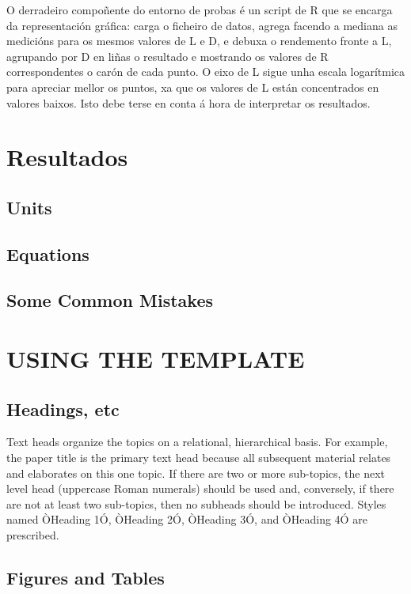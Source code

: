 \documentclass[letterpaper, 10 pt,spanish, conference]{ieeeconf}  %
\begin{document}
    O derradeiro compoñente do entorno de probas é un script de R que se encarga da representación gráfica: carga o ficheiro de datos, agrega facendo a mediana as medicións para os mesmos valores de L e D, e debuxa o rendemento fronte a L, agrupando por D en liñas o resultado e mostrando os valores de R correspondentes o carón de cada punto. O eixo de L sigue unha escala logarítmica para apreciar mellor os puntos, xa que os valores de L están concentrados en valores baixos. Isto debe terse en conta á hora de interpretar os resultados.

\section{Resultados}


\subsection{Units}

\subsection{Equations}


\subsection{Some Common Mistakes}

\section{USING THE TEMPLATE}

\subsection{Headings, etc}

Text heads organize the topics on a relational, hierarchical basis. For example, the paper title is the primary text head because all subsequent material relates and elaborates on this one topic. If there are two or more sub-topics, the next level head (uppercase Roman numerals) should be used and, conversely, if there are not at least two sub-topics, then no subheads should be introduced. Styles named ÒHeading 1Ó, ÒHeading 2Ó, ÒHeading 3Ó, and ÒHeading 4Ó are prescribed.

\subsection{Figures and Tables}
\end{document}
